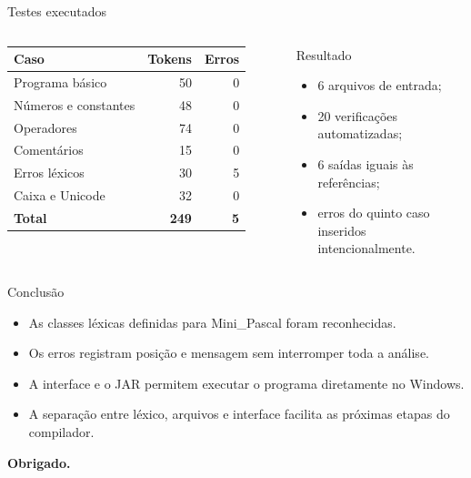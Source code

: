 \documentclass[aspectratio=169,11pt]{beamer}
\begin{document}
\begin{frame}{Testes executados}
  \begin{columns}[T,onlytextwidth]
      \small
      \begin{tabular}{lrr}
        \toprule
        \textbf{Caso} & \textbf{Tokens} & \textbf{Erros} \\
        \midrule
        Programa básico & 50 & 0 \\
        Números e constantes & 48 & 0 \\
        Operadores & 74 & 0 \\
        Comentários & 15 & 0 \\
        Erros léxicos & 30 & 5 \\
        Caixa e Unicode & 32 & 0 \\
        \midrule
        \textbf{Total} & \textbf{249} & \textbf{5} \\
        \bottomrule
      \end{tabular}

      \begin{block}{Resultado}
        \begin{itemize}
          \item 6 arquivos de entrada;
          \item 20 verificações automatizadas;
          \item 6 saídas iguais às referências;
          \item erros do quinto caso inseridos intencionalmente.
        \end{itemize}
      \end{block}
  \end{columns}
\end{frame}

\begin{frame}{Conclusão}
  \begin{itemize}
    \item As classes léxicas definidas para Mini\_Pascal foram reconhecidas.
    \item Os erros registram posição e mensagem sem interromper toda a análise.
    \item A interface e o JAR permitem executar o programa diretamente no Windows.
    \item A separação entre léxico, arquivos e interface facilita as próximas etapas do compilador.
  \end{itemize}

  \vfill
  \begin{center}
    \Large\textbf{Obrigado.}
  \end{center}
\end{frame}
\end{document}
